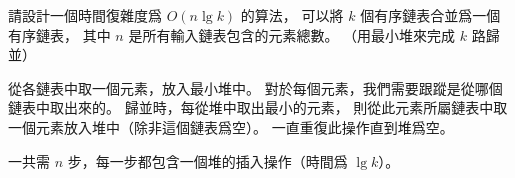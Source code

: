 請設計一個時間復雜度爲 $O(n\lg{k})$ 的算法，
可以將 $k$ 個有序鏈表合並爲一個有序鏈表，
其中 $n$ 是所有輸入鏈表包含的元素總數。
（\hint 用最小堆來完成 $k$ 路歸並）
\stopEXERCISE

\startANSWER
從各鏈表中取一個元素，放入最小堆中。
對於每個元素，我們需要跟蹤是從哪個鏈表中取出來的。
歸並時，每從堆中取出最小的元素，
則從此元素所屬鏈表中取一個元素放入堆中（除非這個鏈表爲空）。
一直重復此操作直到堆爲空。

一共需 $n$ 步，每一步都包含一個堆的插入操作（時間爲 $\lg{k}$）。
\stopANSWER
